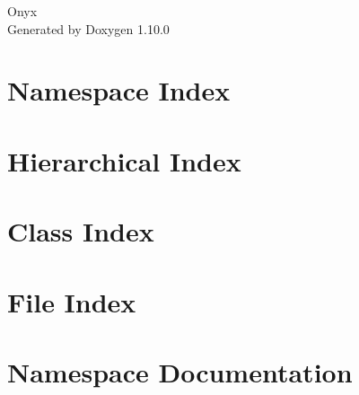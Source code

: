 \documentclass[twoside]{book}
\newcommand{\+}{\discretionary{\mbox{\scriptsize$\hookleftarrow$}}{}{}}
\newcommand{\clearemptydoublepage}{%
    \newpage{\pagestyle{empty}\cleardoublepage}%
  }
\begin{document}
  \raggedbottom
    \hypersetup{pageanchor=false,
                bookmarksnumbered=true,
                pdfencoding=unicode
               }
  \begin{titlepage}
  \vspace*{7cm}
  \begin{center}%
  {\Large Onyx}\\
  \vspace*{1cm}
  {\large Generated by Doxygen 1.10.0}\\
  \end{center}
  \end{titlepage}
  \clearemptydoublepage
  \tableofcontents
  \clearemptydoublepage
  \hypersetup{pageanchor=true}
\chapter{Namespace Index}

\chapter{Hierarchical Index}

\chapter{Class Index}

\chapter{File Index}

\chapter{Namespace Documentation}





\end{document}
